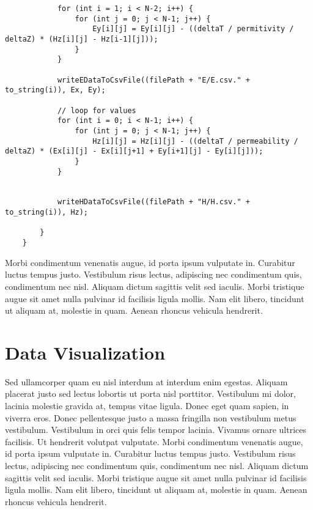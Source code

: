 \begin{verbatim}
			for (int i = 1; i < N-2; i++) {
				for (int j = 0; j < N-1; j++) {
					Ey[i][j] = Ey[i][j] - ((deltaT / permitivity / deltaZ) * (Hz[i][j] - Hz[i-1][j]));
				}
			}
			
			writeEDataToCsvFile((filePath + "E/E.csv." + to_string(i)), Ex, Ey);
			
			// loop for values
			for (int i = 0; i < N-1; i++) {
				for (int j = 0; j < N-1; j++) {
					Hz[i][j] = Hz[i][j] - ((deltaT / permeability / deltaZ) * (Ex[i][j] - Ex[i][j+1] + Ey[i+1][j] - Ey[i][j]));
				}
			}
			
			
			writeHDataToCsvFile((filePath + "H/H.csv." + to_string(i)), Hz);
			
		}
	}
\end{verbatim}

Morbi condimentum venenatis augue, id porta ipsum vulputate in. Curabitur luctus tempus justo. Vestibulum risus lectus, adipiscing nec condimentum quis, condimentum nec nisl. Aliquam dictum sagittis velit sed iaculis. Morbi tristique augue sit amet nulla pulvinar id facilisis ligula mollis. Nam elit libero, tincidunt ut aliquam at, molestie in quam. Aenean rhoncus vehicula hendrerit.

\section{Data Visualization}
Sed ullamcorper quam eu nisl interdum at interdum enim egestas. Aliquam placerat justo sed lectus lobortis ut porta nisl porttitor. Vestibulum mi dolor, lacinia molestie gravida at, tempus vitae ligula. Donec eget quam sapien, in viverra eros. Donec pellentesque justo a massa fringilla non vestibulum metus vestibulum. Vestibulum in orci quis felis tempor lacinia. Vivamus ornare ultrices facilisis. Ut hendrerit volutpat vulputate. Morbi condimentum venenatis augue, id porta ipsum vulputate in. Curabitur luctus tempus justo. Vestibulum risus lectus, adipiscing nec condimentum quis, condimentum nec nisl. Aliquam dictum sagittis velit sed iaculis. Morbi tristique augue sit amet nulla pulvinar id facilisis ligula mollis. Nam elit libero, tincidunt ut aliquam at, molestie in quam. Aenean rhoncus vehicula hendrerit.